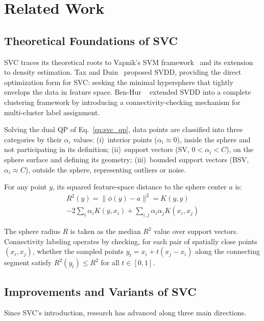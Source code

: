 \section{Related Work}

\subsection{Theoretical Foundations of SVC}

SVC traces its theoretical roots to Vapnik's SVM framework~\cite{scholkopf2002} and its extension to density estimation. Tax and Duin~\cite{tax1999,tax2004} proposed SVDD, providing the direct optimization form for SVC: seeking the minimal hypersphere that tightly envelops the data in feature space. Ben-Hur \etal~\cite{benhur2001} extended SVDD into a complete clustering framework by introducing a connectivity-checking mechanism for multi-cluster label assignment.

Solving the dual QP of Eq.~\eqref{eq:svc_qp}, data points are classified into three categories by their $\alpha_i$ values: (i)~interior points ($\alpha_i\approx0$), inside the sphere and not participating in its definition; (ii)~support vectors (SV, $0<\alpha_i<C$), on the sphere surface and defining its geometry; (iii)~bounded support vectors (BSV, $\alpha_i\approx C$), outside the sphere, representing outliers or noise.

For any point $y$, its squared feature-space distance to the sphere center $a$ is:
\begin{equation}
\begin{split}
R^2(y)=\|\phi(y)-a\|^2=K(y,y) \\
-2\sum_i\alpha_i K(y,x_i)+\sum_{i,j}\alpha_i\alpha_j K(x_i,x_j)
\end{split}
\end{equation}

The sphere radius $R$ is taken as the median $R^2$ value over support vectors. Connectivity labeling operates by checking, for each pair of spatially close points $(x_i,x_j)$, whether the sampled points $y_t=x_i+t(x_j-x_i)$ along the connecting segment satisfy $R^2(y_t)\leq R^2$ for all $t\in[0,1]$.

\subsection{Improvements and Variants of SVC}

Since SVC's introduction, research has advanced along three main directions.

